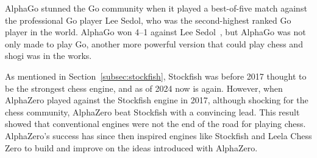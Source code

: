 AlphaGo stunned the Go community when it played a best-of-five match against the professional
Go player Lee Sedol, who was the second-highest ranked Go player in the world.
AlphaGo won 4--1 against Lee Sedol~\cite{alpha-go-zero}, but AlphaGo was not only made to play Go, another more powerful
version that could play chess and shogi was in the works.

As mentioned in Section~\ref{subsec:stockfish}, Stockfish was before 2017 thought to be the strongest chess engine,
and as of 2024 now is again.
However, when AlphaZero played against the Stockfish engine in 2017, although shocking for the chess community,
AlphaZero beat Stockfish with a convincing lead.
This result showed that conventional engines were not the end of the road for playing chess.
AlphaZero's success has since then inspired engines like Stockfish and Leela Chess Zero to build and improve on the
ideas introduced with AlphaZero.
